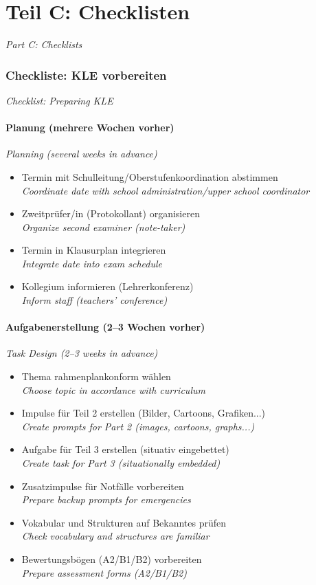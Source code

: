 \documentclass[11pt,a4paper]{article}
\newcommand{\bisection}[2]{%
    \section{#1}%
    {\small\color{englishgray}\textit{#2}}\par\vspace{6pt}%
}
\newcommand{\bisubsection}[2]{%
    \subsection{#1}%
    {\small\color{englishgray}\textit{#2}}\par\vspace{4pt}%
}
\begin{document}
\part*{\color{spanischrot}Teil C: Checklisten}
{\large\color{englishgray}\textit{Part C: Checklists}}

\bisection{Checkliste: KLE vorbereiten}{Checklist: Preparing KLE}

\bisubsection{Planung (mehrere Wochen vorher)}{Planning (several weeks in advance)}

\begin{itemize}[label=$\square$]
\item Termin mit Schulleitung/Oberstufenkoordination abstimmen\\ {\color{englishgray}\textit{Coordinate date with school administration/upper school coordinator}}
\item Zweitprüfer/in (Protokollant) organisieren\\ {\color{englishgray}\textit{Organize second examiner (note-taker)}}
\item Termin in Klausurplan integrieren\\ {\color{englishgray}\textit{Integrate date into exam schedule}}
\item Kollegium informieren (Lehrerkonferenz)\\ {\color{englishgray}\textit{Inform staff (teachers' conference)}}
\end{itemize}

\bisubsection{Aufgabenerstellung (2--3 Wochen vorher)}{Task Design (2--3 weeks in advance)}

\begin{itemize}[label=$\square$]
\item Thema rahmenplankonform wählen\\ {\color{englishgray}\textit{Choose topic in accordance with curriculum}}
\item Impulse für Teil 2 erstellen (Bilder, Cartoons, Grafiken...)\\ {\color{englishgray}\textit{Create prompts for Part 2 (images, cartoons, graphs...)}}
\item Aufgabe für Teil 3 erstellen (situativ eingebettet)\\ {\color{englishgray}\textit{Create task for Part 3 (situationally embedded)}}
\item Zusatzimpulse für Notfälle vorbereiten\\ {\color{englishgray}\textit{Prepare backup prompts for emergencies}}
\item Vokabular und Strukturen auf Bekanntes prüfen\\ {\color{englishgray}\textit{Check vocabulary and structures are familiar}}
\item Bewertungsbögen (A2/B1/B2) vorbereiten\\ {\color{englishgray}\textit{Prepare assessment forms (A2/B1/B2)}}
\end{itemize}
\end{document}
